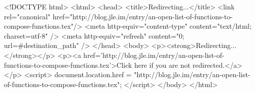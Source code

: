 <!DOCTYPE html>
<html>
<head>
<title>Redirecting...</title>
<link rel="canonical" href="http://blog.jle.im/entry/an-open-list-of-functions-to-compose-functions.tex"/>
<meta http-equiv="content-type" content="text/html; charset=utf-8" />
<meta http-equiv="refresh" content="0; url=#{destination_path}" />
</head>
<body>
  <p><strong>Redirecting...</strong></p>
  <p><a href='http://blog.jle.im/entry/an-open-list-of-functions-to-compose-functions.tex'>Click here if you are not redirected.</a></p>
  <script>
    document.location.href = "http://blog.jle.im/entry/an-open-list-of-functions-to-compose-functions.tex";
  </script>
</body>
</html>
